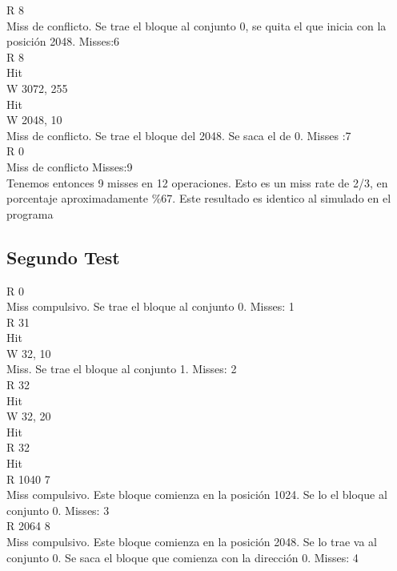 \documentclass[11pt,a4paper, spanish]{article}
\begin{document}
R 8 \\
Miss de conflicto. Se trae el bloque al conjunto 0, se quita el que inicia con la posición 2048. Misses:6\\

R 8 \\
Hit\\
 
W 3072, 255\\
Hit\\

W 2048, 10 \\
Miss de conflicto. Se trae el bloque del 2048. Se saca el de 0. Misses :7\\

R 0 \\
Miss de conflicto Misses:9\\

Tenemos entonces 9 misses en 12 operaciones. Esto es un miss rate de 2/3, en porcentaje aproximadamente \%67. Este resultado es identico al simulado en el programa\\

\subsection{Segundo Test}

R 0 \\
Miss compulsivo. Se trae el bloque al conjunto 0. Misses: 1\\

R 31\\
Hit\\

W 32, 10\\
Miss. Se trae el bloque al conjunto 1. Misses: 2\\

R 32\\
Hit\\

W 32, 20\\
Hit\\

R 32\\
Hit\\

R 1040 7\\
Miss compulsivo. Este bloque comienza en la posición 1024. Se lo el bloque al conjunto 0.  Misses: 3\\

R 2064 8\\ 
Miss compulsivo. Este bloque comienza en la posición 2048. Se lo trae va al conjunto 0. Se saca el bloque que comienza con la dirección 0. Misses: 4\\
\end{document}
